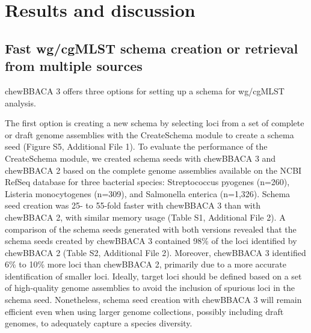 \section{Results and discussion} \label{sec:results_and_discussion}

\subsection{Fast wg/cgMLST schema creation or retrieval from multiple sources} \label{ssec:results_discussion_ssec1}

chewBBACA 3 offers three options for setting up a schema for wg/cgMLST analysis.

The first option is creating a new schema by selecting loci from a set of complete or draft genome assemblies with the CreateSchema module to create a schema seed (Figure S5, Additional File 1). To evaluate the performance of the CreateSchema module, we created schema seeds with chewBBACA 3 and chewBBACA 2 based on the complete genome assemblies available on the NCBI RefSeq database \citep{sayers_database_2022} for three bacterial species: Streptococcus pyogenes (n=260), Listeria monocytogenes (n=309), and Salmonella enterica (n=1,326). Schema seed creation was 25- to 55-fold faster with chewBBACA 3 than with chewBBACA 2, with similar memory usage (Table S1, Additional File 2). A comparison of the schema seeds generated with both versions revealed that the schema seeds created by chewBBACA 3 contained 98\% of the loci identified by chewBBACA 2 (Table S2, Additional File 2). Moreover, chewBBACA 3 identified 6\% to 10\% more loci than chewBBACA 2, primarily due to a more accurate identification of smaller loci. Ideally, target loci should be defined based on a set of high-quality genome assemblies to avoid the inclusion of spurious loci in the schema seed. Nonetheless, schema seed creation with chewBBACA 3 will remain efficient even when using larger genome collections, possibly including draft genomes, to adequately capture a species diversity.

